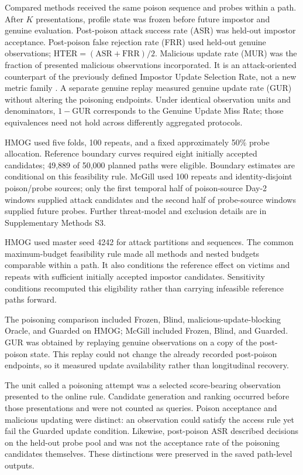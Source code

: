 \documentclass[technologies,article,submit,moreauthors]{Definitions/mdpi}
\begin{document}
Compared methods received the same poison sequence and probes within a path. After \(K\) presentations, profile state was frozen before future impostor and genuine evaluation. Post-poison attack success rate (ASR) was held-out impostor acceptance. Post-poison false rejection rate (FRR) used held-out genuine observations; \(\mathrm{HTER}=(\mathrm{ASR}+\mathrm{FRR})/2\). Malicious update rate (MUR) was the fraction of presented malicious observations incorporated. It is an attack-oriented counterpart of the previously defined Impostor Update Selection Rate, not a new metric family \cite{Giot2012HybridTemplateUpdate}. A separate genuine replay measured genuine update rate (GUR) without altering the poisoning endpoints. Under identical observation units and denominators, \(1-\mathrm{GUR}\) corresponds to the Genuine Update Miss Rate; those equivalences need not hold across differently aggregated protocols.

HMOG used five folds, 100 repeats, and a fixed approximately 50\% probe allocation. Reference boundary curves required eight initially accepted candidates; 49,889 of 50,000 planned paths were eligible. Boundary estimates are conditional on this feasibility rule. McGill used 100 repeats and identity-disjoint poison/probe sources; only the first temporal half of poison-source Day-2 windows supplied attack candidates and the second half of probe-source windows supplied future probes. Further threat-model and exclusion details are in Supplementary Methods S3.

HMOG used master seed 4242 for attack partitions and sequences. The common maximum-budget feasibility rule made all methods and nested budgets comparable within a path. It also conditions the reference effect on victims and repeats with sufficient initially accepted impostor candidates. Sensitivity conditions recomputed this eligibility rather than carrying infeasible reference paths forward.

The poisoning comparison included Frozen, Blind, malicious-update-blocking Oracle, and Guarded on HMOG; McGill included Frozen, Blind, and Guarded. GUR was obtained by replaying genuine observations on a copy of the post-poison state. This replay could not change the already recorded post-poison endpoints, so it measured update availability rather than longitudinal recovery.

The unit called a poisoning attempt was a selected score-bearing observation presented to the online rule. Candidate generation and ranking occurred before those presentations and were not counted as queries. Poison acceptance and malicious updating were distinct: an observation could satisfy the access rule yet fail the Guarded update condition. Likewise, post-poison ASR described decisions on the held-out probe pool and was not the acceptance rate of the poisoning candidates themselves. These distinctions were preserved in the saved path-level outputs.
\end{document}
